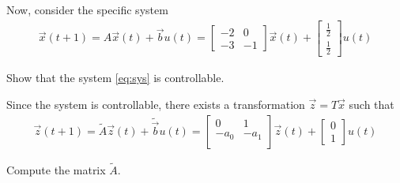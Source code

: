 
\begin{enumerate}
Now, consider the specific system
\begin{align} \label{eq:sys}
\vec{x}(t+1) = A \vec{x}(t) + \vec{b} u(t) = \begin{bmatrix}
-2 & 0 \\
-3 & -1
\end{bmatrix} \vec{x}(t) + 
\begin{bmatrix}
\frac{1}{2} \\
\frac{1}{2}
\end{bmatrix} u(t)
\end{align}

\begin{enumerate}[resume]
\qitem Show that the system \eqref{eq:sys} is controllable.

\end{enumerate}

Since the system is controllable,
there exists a transformation $\vec{z} = T\vec{x}$ such that
\begin{align} \label{eq:canonical}
\vec{z}(t+1) = \widetilde{A}\vec{z}(t) + \widetilde{\vec{b}} u(t) = \begin{bmatrix}
0 & 1  \\
 -a_0 & -a_1 \\
\end{bmatrix} 
\vec{z}(t) +
\begin{bmatrix}
0  \\ 1
\end{bmatrix}
u(t)
\end{align}

\begin{enumerate}[resume]
\qitem Compute the matrix $\widetilde{A}$. 



\end{enumerate}
\end{enumerate}
